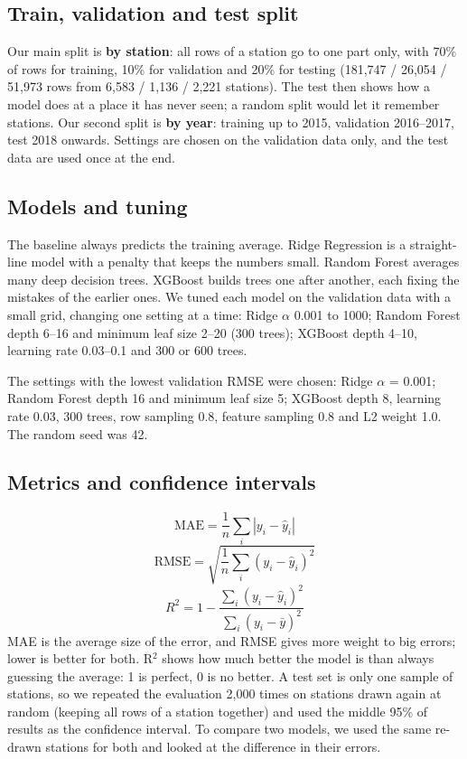 \documentclass[conference]{IEEEtran}
\begin{document}
\subsection{Train, validation and test split}
Our main split is \textbf{by station}: all rows of a station go to one part only, with 70\% of rows for training, 10\% for validation and 20\% for testing (181,747 / 26,054 / 51,973 rows from 6,583 / 1,136 / 2,221 stations). The test then shows how a model does at a place it has never seen; a random split would let it remember stations. Our second split is \textbf{by year}: training up to 2015, validation 2016--2017, test 2018 onwards. Settings are chosen on the validation data only, and the test data are used once at the end.

\subsection{Models and tuning}
The baseline always predicts the training average. Ridge Regression is a straight-line model with a penalty that keeps the numbers small. Random Forest averages many deep decision trees. XGBoost builds trees one after another, each fixing the mistakes of the earlier ones. We tuned each model on the validation data with a small grid, changing one setting at a time: Ridge $\alpha$ 0.001 to 1000; Random Forest depth 6--16 and minimum leaf size 2--20 (300 trees); XGBoost depth 4--10, learning rate 0.03--0.1 and 300 or 600 trees.

The settings with the lowest validation RMSE were chosen: Ridge $\alpha$ = 0.001; Random Forest depth 16 and minimum leaf size 5; XGBoost depth 8, learning rate 0.03, 300 trees, row sampling 0.8, feature sampling 0.8 and L2 weight 1.0. The random seed was 42.

\subsection{Metrics and confidence intervals}
\[\mathrm{MAE}=\frac{1}{n}\sum_i |y_i-\hat y_i|\]
\[\mathrm{RMSE}=\sqrt{\frac{1}{n}\sum_i (y_i-\hat y_i)^2}\]
\[R^2=1-\frac{\sum_i (y_i-\hat y_i)^2}{\sum_i (y_i-\bar y)^2}\]
MAE is the average size of the error, and RMSE gives more weight to big errors; lower is better for both. R$^2$ shows how much better the model is than always guessing the average: 1 is perfect, 0 is no better. A test set is only one sample of stations, so we repeated the evaluation 2,000 times on stations drawn again at random (keeping all rows of a station together) and used the middle 95\% of results as the confidence interval. To compare two models, we used the same re-drawn stations for both and looked at the difference in their errors.
\end{document}
